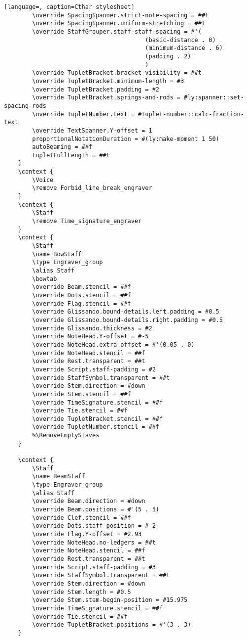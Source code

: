 \begin{lstlisting}[language=, caption=Cthar stylesheet]
        \override SpacingSpanner.strict-note-spacing = ##t
        \override SpacingSpanner.uniform-stretching = ##t
        \override StaffGrouper.staff-staff-spacing = #'(
										(basic-distance . 0) 
										(minimum-distance . 6) 
										(padding . 2)
										)
        \override TupletBracket.bracket-visibility = ##t
        \override TupletBracket.minimum-length = #3
        \override TupletBracket.padding = #2
        \override TupletBracket.springs-and-rods = #ly:spanner::set-spacing-rods
        \override TupletNumber.text = #tuplet-number::calc-fraction-text
		\override TextSpanner.Y-offset = 1
		proportionalNotationDuration = #(ly:make-moment 1 50)
        autoBeaming = ##f
        tupletFullLength = ##t
    }
	\context {
        \Voice
        \remove Forbid_line_break_engraver
    }
    \context {
        \Staff
        \remove Time_signature_engraver
    }
	\context {
        \Staff
        \name BowStaff
        \type Engraver_group
        \alias Staff
        \bowtab
        \override Beam.stencil = ##f
        \override Dots.stencil = ##f
        \override Flag.stencil = ##f
        \override Glissando.bound-details.left.padding = #0.5
        \override Glissando.bound-details.right.padding = #0.5
        \override Glissando.thickness = #2
        \override NoteHead.Y-offset = #-5
        \override NoteHead.extra-offset = #'(0.05 . 0)
		\override NoteHead.stencil = ##f
		\override Rest.transparent = ##t
        \override Script.staff-padding = #2
        \override StaffSymbol.transparent = ##t
        \override Stem.direction = #down
        \override Stem.stencil = ##f
        \override TimeSignature.stencil = ##f
		\override Tie.stencil = ##f
        \override TupletBracket.stencil = ##f
        \override TupletNumber.stencil = ##f
		%\RemoveEmptyStaves
    }

	\context {
        \Staff
        \name BeamStaff
        \type Engraver_group
        \alias Staff
        \override Beam.direction = #down
        \override Beam.positions = #'(5 . 5)
        \override Clef.stencil = ##f
        \override Dots.staff-position = #-2
        \override Flag.Y-offset = #2.93
        \override NoteHead.no-ledgers = ##t
        \override NoteHead.stencil = ##f
		\override Rest.transparent = ##t
        \override Script.staff-padding = #3
        \override StaffSymbol.transparent = ##t
        \override Stem.direction = #down
        \override Stem.length = #0.5
        \override Stem.stem-begin-position = #15.975
        \override TimeSignature.stencil = ##f
		\override Tie.stencil = ##f
        \override TupletBracket.positions = #'(3 . 3)
    }


\end{lstlisting}
